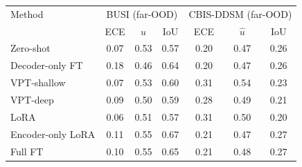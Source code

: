 \begin{tabular}{lcccccc}
\toprule
Method & \multicolumn{3}{c}{BUSI (far-OOD)} & \multicolumn{3}{c}{CBIS-DDSM (far-OOD)} \\
 & ECE & $\hat{u}$ & IoU & ECE & $\hat{u}$ & IoU \\
\midrule
Zero-shot & 0.07 & 0.53 & 0.57 & 0.20 & 0.47 & 0.26 \\
Decoder-only FT & 0.18 & 0.46 & 0.64 & 0.20 & 0.47 & 0.26 \\
VPT-shallow & 0.07 & 0.53 & 0.60 & 0.31 & 0.54 & 0.23 \\
VPT-deep & 0.09 & 0.50 & 0.59 & 0.28 & 0.49 & 0.21 \\
LoRA & 0.06 & 0.51 & 0.57 & 0.31 & 0.50 & 0.20 \\
Encoder-only LoRA & 0.11 & 0.55 & 0.67 & 0.21 & 0.47 & 0.27 \\
Full FT & 0.10 & 0.55 & 0.65 & 0.21 & 0.48 & 0.27 \\
\bottomrule
\end{tabular}
